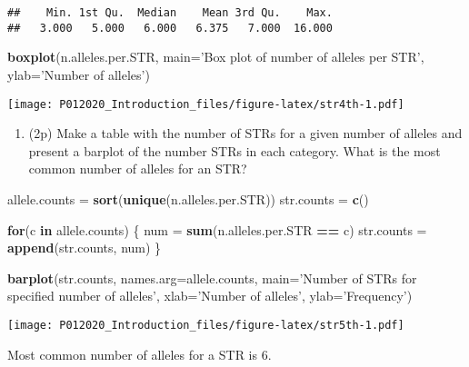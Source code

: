 \documentclass[
]{article}
\newenvironment{Shaded}{\begin{snugshade}}{\end{snugshade}}
\newcommand{\ControlFlowTok}[1]{\textcolor[rgb]{0.13,0.29,0.53}{\textbf{#1}}}
\newcommand{\DataTypeTok}[1]{\textcolor[rgb]{0.13,0.29,0.53}{#1}}
\newcommand{\KeywordTok}[1]{\textcolor[rgb]{0.13,0.29,0.53}{\textbf{#1}}}
\newcommand{\NormalTok}[1]{#1}
\newcommand{\OperatorTok}[1]{\textcolor[rgb]{0.81,0.36,0.00}{\textbf{#1}}}
\newcommand{\StringTok}[1]{\textcolor[rgb]{0.31,0.60,0.02}{#1}}
\providecommand{\tightlist}{%
  \setlength{\itemsep}{0pt}\setlength{\parskip}{0pt}}
\begin{document}
\begin{verbatim}
##    Min. 1st Qu.  Median    Mean 3rd Qu.    Max. 
##   3.000   5.000   6.000   6.375   7.000  16.000
\end{verbatim}

\begin{Shaded}
\begin{Highlighting}[]
\KeywordTok{boxplot}\NormalTok{(n.alleles.per.STR, }\DataTypeTok{main=}\StringTok{'Box plot of number of alleles per STR'}\NormalTok{, }\DataTypeTok{ylab=}\StringTok{'Number of alleles'}\NormalTok{)}
\end{Highlighting}
\end{Shaded}

\texttt{[image: P012020\_Introduction\_files/figure-latex/str4th-1.pdf]}

\begin{enumerate}
\def\labelenumi{\arabic{enumi}.}
\setcounter{enumi}{4}
\tightlist
\item
  (2p) Make a table with the number of STRs for a given number of
  alleles and present a barplot of the number STRs in each category.
  What is the most common number of alleles for an STR?
\end{enumerate}

\begin{Shaded}
\begin{Highlighting}[]
\NormalTok{allele.counts =}\StringTok{ }\KeywordTok{sort}\NormalTok{(}\KeywordTok{unique}\NormalTok{(n.alleles.per.STR))}
\NormalTok{str.counts =}\StringTok{ }\KeywordTok{c}\NormalTok{()}

\ControlFlowTok{for}\NormalTok{(c }\ControlFlowTok{in}\NormalTok{ allele.counts) \{}
\NormalTok{  num =}\StringTok{ }\KeywordTok{sum}\NormalTok{(n.alleles.per.STR }\OperatorTok{==}\StringTok{ }\NormalTok{c)}
\NormalTok{  str.counts =}\StringTok{ }\KeywordTok{append}\NormalTok{(str.counts, num)}
\NormalTok{\}}

\KeywordTok{barplot}\NormalTok{(str.counts, }\DataTypeTok{names.arg=}\NormalTok{allele.counts, }\DataTypeTok{main=}\StringTok{'Number of STRs for specified number of alleles'}\NormalTok{, }\DataTypeTok{xlab=}\StringTok{'Number of alleles'}\NormalTok{, }\DataTypeTok{ylab=}\StringTok{'Frequency'}\NormalTok{)}
\end{Highlighting}
\end{Shaded}

\texttt{[image: P012020\_Introduction\_files/figure-latex/str5th-1.pdf]}

Most common number of alleles for a STR is 6.
\end{document}

